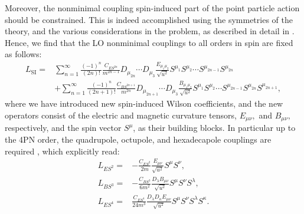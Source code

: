 \documentclass[a4paper,11pt]{article}
\newcommand{\nn}{\nonumber}
\begin{document}
Moreover, the nonminimal coupling spin-induced part of the point particle action should be 
constrained. This is indeed accomplished using the symmetries of the theory, and the various 
considerations in the problem, as described in detail in \cite{Levi:2015msa}. Hence, we find 
that the LO nonminimal couplings to all orders in spin are fixed as follows: 
\begin{align} \label{sinmc}
L_{\text{SI}}=&\sum_{n=1}^{\infty} \frac{\left(-1\right)^n}{\left(2n\right)!}
\frac{C_{ES^{2n}}}{m^{2n-1}} D_{\mu_{2n}}\cdots D_{\mu_3}
\frac{E_{\mu_1\mu_2}}{\sqrt{u^2}} S^{\mu_1}S^{\mu_2}\cdots 
S^{\mu_{2n-1}}S^{\mu_{2n}}\nn\\
&+\sum_{n=1}^{\infty} \frac{\left(-1\right)^n}{\left(2n+1\right)!}
\frac{C_{BS^{2n+1}}}{m^{2n}} 
D_{\mu_{2n+1}}\cdots D_{\mu_3}\frac{B_{\mu_1\mu_2}}{\sqrt{u^2}} 
S^{\mu_1}S^{\mu_2}\cdots 
S^{\mu_{2n-1}}S^{\mu_{2n}}S^{\mu_{2n+1}},
\end{align}
where we have introduced new spin-induced Wilson coefficients, and the new operators consist 
of the electric and magnetic curvature tensors, $E_{\mu\nu},$ and $B_{\mu\nu},$ 
respectively, and the spin vector $S^{\mu}$, as their building blocks. In particular up to 
the 4PN order, the quadrupole, octupole, and hexadecapole couplings are required 
\cite{Levi:2014gsa,Levi:2015msa,Levi:2015ixa}, which explicitly read:
\begin{align} \label{es2bs3es4}
L_{ES^2} =& -\frac{C_{ES^2}}{2m} \frac{E_{\mu\nu}}{\sqrt{u^2}} 
S^{\mu} S^{\nu},\\
L_{BS^3}=&-\frac{C_{BS^3}}{6m^2}\frac{D_\lambda B_{\mu\nu}}
{\sqrt{u^2}}S^{\mu} S^{\nu} S^{\lambda},\\
L_{ES^4}=&\frac{C_{ES^4}}{24m^3} \frac{D_\lambda D_\kappa 
E_{\mu\nu}}{\sqrt{u^2}} S^{\mu} S^{\nu} S^{\lambda} S^{\kappa}.
\end{align}
\end{document}
